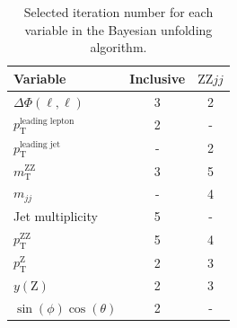 \begin{table}[!htbp]
    \centering
    \caption{Selected iteration number for each variable in the Bayesian unfolding algorithm.}
    \begin{tabular}{l|cc} \toprule
    \textbf{Variable} & \textbf{Inclusive} & \textbf{$\text{ZZ}jj$} \\ \midrule
        $\Delta\Phi(\ell,\ell)$             & 3         & 2 \\
        $p_{\text{T}}^{\text{leading lepton}}$ & 2         & - \\
        $p_{\text{T}}^{\text{leading jet}}$    & -         & 2 \\
        $m_{\text{T}}^{\text{ZZ}}$                  & 3         & 5 \\
        $m_{jj}$                      & -         & 4 \\
        Jet multiplicity              & 5         & - \\
        $p_{\text{T}}^{\text{ZZ}}$                  & 5         & 4 \\
        $p_{\text{T}}^{\text{Z}}$                   & 2         & 3 \\
        $y(\text{Z})$                        & 2         & 3 \\
        $\sin(\phi)\cos(\theta)$        & 2         & - \\ \bottomrule
    \end{tabular}
    \label{tab:unfolding_technical_closure_n_itr}
\end{table}

\FloatBarrier


